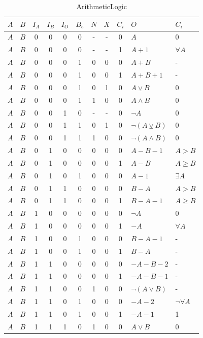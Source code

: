 \documentclass{article}
\begin{document}
\begin{table}[p]
    \centering
    \begin{tabular}{cc|ccccccc|ll}
        $A$ & $B$ & $I_A$ & $I_B$ & $I_O$ & $B_e$ & $N$ & $X$ & $C_i$ & $O$ & $C_i$ \\
        \hline
        $A$ & $B$ & 0 & 0 & 0 & 0 & - & - & 0 & $A$ & 0 \\
        $A$ & $B$ & 0 & 0 & 0 & 0 & - & - & 1 & $A + 1$ & $\forall A$ \\
        $A$ & $B$ & 0 & 0 & 0 & 1 & 0 & 0 & 0 & $A + B$ & - \\
        $A$ & $B$ & 0 & 0 & 0 & 1 & 0 & 0 & 1 & $A + B + 1$ & - \\
        $A$ & $B$ & 0 & 0 & 0 & 1 & 0 & 1 & 0 & $A \veebar B$ & 0 \\
        $A$ & $B$ & 0 & 0 & 0 & 1 & 1 & 0 & 0 & $A \wedge B$ & 0 \\
        $A$ & $B$ & 0 & 0 & 1 & 0 & - & - & 0 & $\neg A$ & 0 \\
        $A$ & $B$ & 0 & 0 & 1 & 1 & 0 & 1 & 0 & $\neg(A \veebar B)$ & 0 \\
        $A$ & $B$ & 0 & 0 & 1 & 1 & 1 & 0 & 0 & $\neg(A \wedge B)$ & 0 \\
        $A$ & $B$ & 0 & 1 & 0 & 0 & 0 & 0 & 0 & $A - B - 1$ & $A > B$\\
        $A$ & $B$ & 0 & 1 & 0 & 0 & 0 & 0 & 1 & $A - B$ & $A \geq B$\\
        $A$ & $B$ & 0 & 1 & 0 & 1 & 0 & 0 & 0 & $A - 1$ & $\exists A$\\
        $A$ & $B$ & 0 & 1 & 1 & 0 & 0 & 0 & 0 & $B - A$ & $A > B$\\
        $A$ & $B$ & 0 & 1 & 1 & 0 & 0 & 0 & 1 & $B - A - 1$ & $A \geq B$\\
        $A$ & $B$ & 1 & 0 & 0 & 0 & 0 & 0 & 0 & $\neg A$ & 0 \\
        $A$ & $B$ & 1 & 0 & 0 & 0 & 0 & 0 & 1 & $-A$ & $\forall A$ \\
        $A$ & $B$ & 1 & 0 & 0 & 1 & 0 & 0 & 0 & $B - A - 1$ & - \\
        $A$ & $B$ & 1 & 0 & 0 & 1 & 0 & 0 & 1 & $B - A$ & - \\
        $A$ & $B$ & 1 & 1 & 0 & 0 & 0 & 0 & 0 & $-A-B-2$ & - \\
        $A$ & $B$ & 1 & 1 & 0 & 0 & 0 & 0 & 1 & $-A-B-1$ & - \\
        $A$ & $B$ & 1 & 1 & 0 & 0 & 1 & 0 & 0 & $\neg(A \vee B)$ & - \\
        $A$ & $B$ & 1 & 1 & 0 & 1 & 0 & 0 & 0 & $-A-2$ & $\neg \forall A$ \\
        $A$ & $B$ & 1 & 1 & 0 & 1 & 0 & 0 & 1 & $-A-1$ & 1 \\
        $A$ & $B$ & 1 & 1 & 1 & 0 & 1 & 0 & 0 & $A \vee B$ & 0 \\
    \end{tabular}
    \caption{ArithmeticLogic}
    \label{tab:al}
\end{table}
\end{document}
